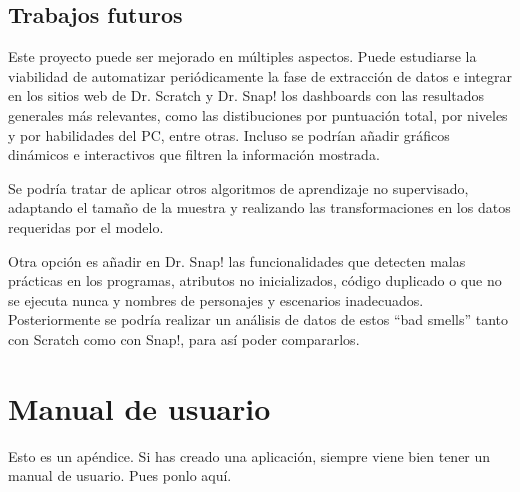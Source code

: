 \documentclass[a4paper, 12pt]{book}
\begin{document}
\section{Trabajos futuros}
\label{sec:trabajos_futuros}


Este proyecto puede ser mejorado en múltiples aspectos. Puede estudiarse la viabilidad de automatizar periódicamente la fase de extracción de datos e integrar en los sitios web de Dr. Scratch y Dr. Snap! los dashboards con las resultados generales más relevantes, como las distibuciones por puntuación total, por niveles y por habilidades del PC, entre otras. Incluso se podrían añadir gráficos dinámicos e interactivos que filtren la información mostrada.

Se podría tratar de aplicar otros algoritmos de aprendizaje no supervisado, adaptando el tamaño de la muestra y realizando las transformaciones en los datos requeridas por el modelo. 

Otra opción es añadir en Dr. Snap! las funcionalidades que detecten malas prácticas en los programas, atributos no inicializados, código duplicado o que no se ejecuta nunca y nombres de personajes y escenarios inadecuados. Posteriormente se podría realizar un análisis de datos de estos ``bad smells'' tanto con Scratch como con Snap!, para así poder compararlos. 



\cleardoublepage
\appendix
\chapter{Manual de usuario}
\label{app:manual}

Esto es un apéndice.
Si has creado una aplicación, siempre viene bien tener un manual de usuario.
Pues ponlo aquí.


\cleardoublepage


\end{document}
